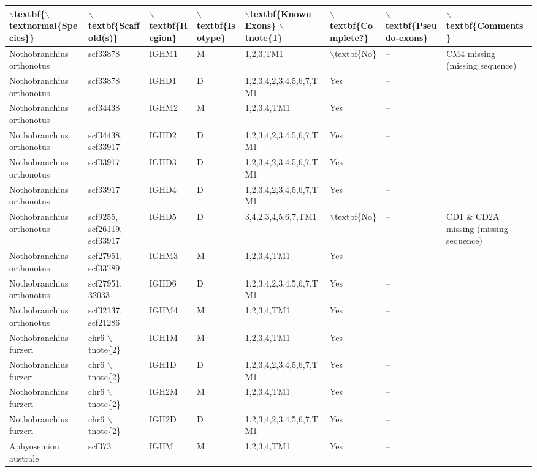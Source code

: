 \begin{tabular}{llllllll}
  \toprule $\backslash$textbf\{$\backslash$textnormal\{Species\}\} & $\backslash$textbf\{Scaffold(s)\} & $\backslash$textbf\{Region\} & $\backslash$textbf\{Isotype\} & $\backslash$textbf\{Known Exons\} $\backslash$tnote\{1\} & $\backslash$textbf\{Complete?\} & $\backslash$textbf\{Pseudo-exons\} & $\backslash$textbf\{Comments\} \\ 
  \midrule Nothobranchius orthonotus & scf33878 & IGHM1 & M & 1,2,3,TM1 & $\backslash$textbf\{No\} & -- & CM4 missing (missing sequence) \\ 
  Nothobranchius orthonotus & scf33878 & IGHD1 & D & 1,2,3,4,2,3,4,5,6,7,TM1 & Yes & -- &  \\ 
  Nothobranchius orthonotus & scf34438 & IGHM2 & M & 1,2,3,4,TM1 & Yes & -- &  \\ 
  Nothobranchius orthonotus & scf34438, scf33917 & IGHD2 & D & 1,2,3,4,2,3,4,5,6,7,TM1 & Yes & -- &  \\ 
  Nothobranchius orthonotus & scf33917 & IGHD3 & D & 1,2,3,4,2,3,4,5,6,7,TM1 & Yes & -- &  \\ 
  Nothobranchius orthonotus & scf33917 & IGHD4 & D & 1,2,3,4,2,3,4,5,6,7,TM1 & Yes & -- &  \\ 
  Nothobranchius orthonotus & scf9255, scf26119, scf33917 & IGHD5 & D & 3,4,2,3,4,5,6,7,TM1 & $\backslash$textbf\{No\} & -- & CD1 \& CD2A missing (missing sequence) \\ 
  Nothobranchius orthonotus & scf27951, scf33789 & IGHM3 & M & 1,2,3,4,TM1 & Yes & -- &  \\ 
  Nothobranchius orthonotus & scf27951, 32033 & IGHD6 & D & 1,2,3,4,2,3,4,5,6,7,TM1 & Yes & -- &  \\ 
  Nothobranchius orthonotus & scf32137, scf21286 & IGHM4 & M & 1,2,3,4,TM1 & Yes & -- &  \\ 
  Nothobranchius furzeri & chr6 $\backslash$tnote\{2\} & IGH1M & M & 1,2,3,4,TM1 & Yes & -- &  \\ 
  Nothobranchius furzeri & chr6 $\backslash$tnote\{2\} & IGH1D & D & 1,2,3,4,2,3,4,5,6,7,TM1 & Yes & -- &  \\ 
  Nothobranchius furzeri & chr6 $\backslash$tnote\{2\} & IGH2M & M & 1,2,3,4,TM1 & Yes & -- &  \\ 
  Nothobranchius furzeri & chr6 $\backslash$tnote\{2\} & IGH2D & D & 1,2,3,4,2,3,4,5,6,7,TM1 & Yes & -- &  \\ 
  Aphyosemion australe & scf373 & IGHM & M & 1,2,3,4,TM1 & Yes & -- &  \\ 

\end{tabular}
